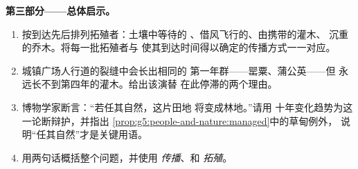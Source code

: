 \begin{problem}
\medskip\noindent\textbf{第三部分——总体启示。}
\begin{enumerate}[resume]
  \item 按到达先后排列拓殖者：土壤中等待的
        、借风飞行的、由携带的灌木、
        沉重的乔木。将每一批拓殖者与
        使其到达时间得以确定的传播方式一一对应。
  \item 城镇广场人行道的裂缝中会长出相同的
        第一年群——罂粟、蒲公英——但
        永远长不到第四年的灌木。给出该演替
        在此停滞的两个理由。
  \item 博物学家断言：“若任其自然，这片田地
        将变成林地。”请用
        十年变化趋势为这一论断辩护，并指出
        \cref{prop:g5:people-and-nature:managed}中的草甸例外，
        说明“任其自然”才是关键用语。
  \item 用两句话概括整个问题，并使用
        \emph{传播}、\emph{}和
        \emph{拓殖}。
\end{enumerate}
\end{problem}
